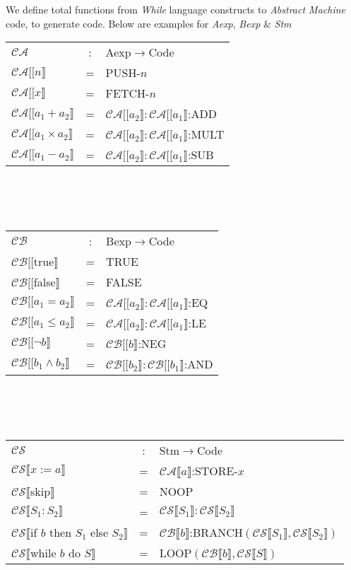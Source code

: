 \documentclass[11pt,a4paper]{article}
\begin{document}
We define total functions from \textit{While} language constructs to \textit{Abstract Machine} code, to generate code. Below are examples for \textit{Aexp}, \textit{Bexp} \& \textit{Stm}\\
\begin{tabular}{lcl}
$\mathcal{CA}$&:&Aexp$\to$Code\\
$\mathcal{CA}[[n\rrbracket$&=&PUSH-$n$\\
$\mathcal{CA}[[x\rrbracket$&=&FETCH-$n$\\
$\mathcal{CA}[[a_1+a_2\rrbracket$&=&$\mathcal{CA}[[a_2\rrbracket:\mathcal{CA}[[a_1\rrbracket$:ADD\\
$\mathcal{CA}[[a_1\times a_2\rrbracket$&=&$\mathcal{CA}[[a_2\rrbracket:\mathcal{CA}[[a_1\rrbracket$:MULT\\
$\mathcal{CA}[[a_1-a_2\rrbracket$&=&$\mathcal{CA}[[a_2\rrbracket:\mathcal{CA}[[a_1\rrbracket$:SUB\\
\end{tabular}\\
\\\\
\begin{tabular}{lcl}
$\mathcal{CB}$&:&Bexp$\to$Code\\
$\mathcal{CB}[[$true$\rrbracket$&=&TRUE\\
$\mathcal{CB}[[$false$\rrbracket$&=&FALSE\\
$\mathcal{CB}[[a_1=a_2\rrbracket$&=&$\mathcal{CA}[[a_2\rrbracket:\mathcal{CA}[[a_1\rrbracket$:EQ\\
$\mathcal{CB}[[a_1\leq a_2\rrbracket$&=&$\mathcal{CA}[[a_2\rrbracket:\mathcal{CA}[[a_1\rrbracket$:LE\\
$\mathcal{CB}[[\neg b\rrbracket$&=&$\mathcal{CB}[[b\rrbracket$:NEG\\
$\mathcal{CB}[[b_1\wedge b_2\rrbracket$&=&$\mathcal{CB}[[b_2\rrbracket:\mathcal{CB}[[b_1\rrbracket$:AND\\
\end{tabular}\\
\\\\
\begin{tabular}{lcl}
$\mathcal{CS}$&:&Stm$\to$Code\\
$\mathcal{CS}\llbracket x:=a\rrbracket$&=&$\mathcal{CA}\llbracket a\rrbracket$:STORE-$x$\\
$\mathcal{CS}\llbracket $skip$\rrbracket$&=&NOOP\\
$\mathcal{CS}\llbracket S_1:S_2\rrbracket$&=&$\mathcal{CS}\llbracket S_1\rrbracket:\mathcal{CS}\llbracket S_2\rrbracket$\\
$\mathcal{CS}\llbracket $if $b$ then $S_1$ else $S_2\rrbracket$&=&$\mathcal{CB}\llbracket b\rrbracket$:BRANCH$(\mathcal{CS}\llbracket S_1\rrbracket,\mathcal{CS}\llbracket S_2\rrbracket)$\\
$\mathcal{CS}\llbracket $while $b$ do $S\rrbracket$&=&LOOP$(\mathcal{CB}\llbracket b\rrbracket,\mathcal{CS}\llbracket S\rrbracket)$
\end{tabular}
\\
\end{document}
